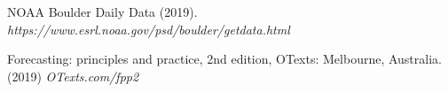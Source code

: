 \documentclass[twoside]{article}
\begin{document}
\begin{multicols}{2}
\begin{thebibliography}{99}
NOAA Boulder Daily Data (2019). {\em https://www.esrl.noaa.gov/psd/boulder/getdata.html}

Forecasting: principles and practice, 2nd edition, OTexts: Melbourne, Australia. (2019) {\em OTexts.com/fpp2}


\end{thebibliography}


\end{multicols}
\end{document}
